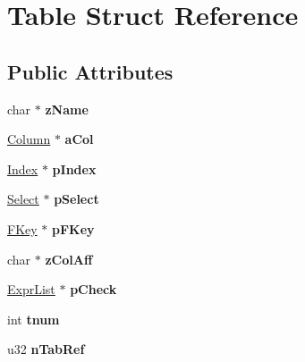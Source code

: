 \hypertarget{struct_table}{}\section{Table Struct Reference}
\label{struct_table}
\subsection*{Public Attributes}
\begin{DoxyCompactItemize}
\item 
\mbox{\label{struct_table_a20ca62607d6da596b1016b76cf677809}} 
char $\ast$ {\bfseries z\+Name}
\item 
\mbox{\label{struct_table_a87ec3b706ecf9545bd9ed582a12ce3e7}} 
\mbox{\hyperlink{struct_column}{Column}} $\ast$ {\bfseries a\+Col}
\item 
\mbox{\label{struct_table_a5dffd0c9e8f0265d6a47b32bd0e6d59f}} 
\mbox{\hyperlink{struct_index}{Index}} $\ast$ {\bfseries p\+Index}
\item 
\mbox{\label{struct_table_a39d620182fe2174fc97d04094421fa60}} 
\mbox{\hyperlink{struct_select}{Select}} $\ast$ {\bfseries p\+Select}
\item 
\mbox{\label{struct_table_a37ccce5ee6d530001d49c82788c6616d}} 
\mbox{\hyperlink{struct_f_key}{F\+Key}} $\ast$ {\bfseries p\+F\+Key}
\item 
\mbox{\label{struct_table_ac95c0c7b04f2c8367beb98d386d4228f}} 
char $\ast$ {\bfseries z\+Col\+Aff}
\item 
\mbox{\label{struct_table_a4513ad39c4adad36fdf5dd3c6cb70a12}} 
\mbox{\hyperlink{struct_expr_list}{Expr\+List}} $\ast$ {\bfseries p\+Check}
\item 
\mbox{\label{struct_table_aebe1abbfb2fd4b5e5dff8e74a4f3c890}} 
int {\bfseries tnum}
\item 
\mbox{\label{struct_table_add919ac83c180478ae8fd62e9ecfbdd3}} 
u32 {\bfseries n\+Tab\+Ref}
\item 
\mbox{\label{struct_table_ad5bb11ce3d3751eb53a72f3bcdb3efef}} 

\end{DoxyCompactItemize}
